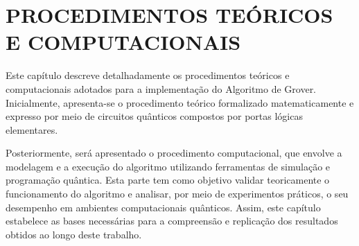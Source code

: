 \chapter{PROCEDIMENTOS TE\'{O}RICOS E COMPUTACIONAIS}
\label{chap: procedimentos}

Este capítulo descreve detalhadamente os procedimentos teóricos e computacionais adotados para a implementação do Algoritmo de Grover. Inicialmente, apresenta-se o procedimento teórico formalizado matematicamente e expresso por meio de circuitos qu\^{a}nticos compostos por portas lógicas elementares.

Posteriormente, será apresentado o procedimento computacional, que envolve a modelagem e a execução do algoritmo utilizando ferramentas de simulação e programação qu\^{a}ntica. Esta parte tem como objetivo validar teoricamente o funcionamento do algoritmo e analisar, por meio de experimentos práticos, o seu desempenho em ambientes computacionais qu\^{a}nticos. Assim, este capítulo estabelece as bases necessárias para a compreensão e replicação dos resultados obtidos ao longo deste trabalho.





